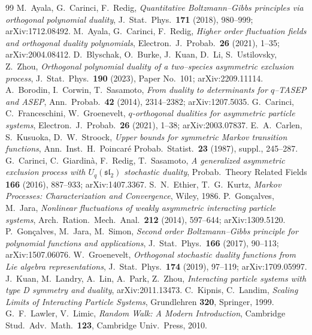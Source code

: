 \documentclass[11pt]{article}
\theoremstyle{plain}
\theoremstyle{definition}
\theoremstyle{remark}
\newcommand{\sutwo}{\mathfrak{sl}_2}\newcommand{\Lt}{\widetilde{\mathcal L}}
\begin{document}
\begin{thebibliography}{99}
 M.~Ayala, G.~Carinci, F.~Redig, \emph{Quantitative Boltzmann--Gibbs
principles via orthogonal polynomial duality}, J.~Stat.~Phys.~\textbf{171} (2018),
980--999; arXiv:1712.08492.
 M.~Ayala, G.~Carinci, F.~Redig, \emph{Higher order fluctuation fields and
orthogonal duality polynomials}, Electron.~J.~Probab.~\textbf{26} (2021), 1--35;
arXiv:2004.08412.
 D.~Blyschak, O.~Burke, J.~Kuan, D.~Li, S.~Ustilovsky, Z.~Zhou,
\emph{Orthogonal polynomial duality of a two--species asymmetric exclusion process},
J.~Stat.~Phys.~\textbf{190} (2023), Paper No.~101; arXiv:2209.11114.
 A.~Borodin, I.~Corwin, T.~Sasamoto, \emph{From duality to determinants for
$q$--TASEP and ASEP}, Ann.~Probab.~\textbf{42} (2014), 2314--2382; arXiv:1207.5035.
 G.~Carinci, C.~Franceschini, W.~Groenevelt, \emph{$q$-orthogonal
dualities for asymmetric particle systems}, Electron.~J.~Probab.~\textbf{26} (2021),
1--38; arXiv:2003.07837.
 E.~A.~Carlen, S.~Kusuoka, D.~W.~Stroock, \emph{Upper bounds for symmetric
Markov transition functions}, Ann.~Inst.~H.~Poincar\'e Probab.~Statist.~\textbf{23}
(1987), suppl., 245--287.
 G.~Carinci, C.~Giardin\`a, F.~Redig, T.~Sasamoto, \emph{A generalized
asymmetric exclusion process with $U_q(\sutwo)$ stochastic duality}, Probab.~Theory
Related Fields \textbf{166} (2016), 887--933; arXiv:1407.3367.
 S.~N.~Ethier, T.~G.~Kurtz, \emph{Markov Processes: Characterization and
Convergence}, Wiley, 1986.
 P.~Gon\c{c}alves, M.~Jara, \emph{Nonlinear fluctuations of weakly asymmetric
interacting particle systems}, Arch.~Ration.~Mech.~Anal.~\textbf{212} (2014), 597--644;
arXiv:1309.5120.
 P.~Gon\c{c}alves, M.~Jara, M.~Simon, \emph{Second order Boltzmann--Gibbs
principle for polynomial functions and applications}, J.~Stat.~Phys.~\textbf{166} (2017),
90--113; arXiv:1507.06076.
 W.~Groenevelt, \emph{Orthogonal stochastic duality functions from Lie
algebra representations}, J.~Stat.~Phys.~\textbf{174} (2019), 97--119; arXiv:1709.05997.
 J.~Kuan, M.~Landry, A.~Lin, A.~Park, Z.~Zhou, \emph{Interacting particle
systems with type D symmetry and duality}, arXiv:2011.13473.
 C.~Kipnis, C.~Landim, \emph{Scaling Limits of Interacting Particle Systems},
Grundlehren \textbf{320}, Springer, 1999.
 G.~F.~Lawler, V.~Limic, \emph{Random Walk: A Modern Introduction},
Cambridge Stud.~Adv.~Math.~\textbf{123}, Cambridge Univ.~Press, 2010.

\end{thebibliography}
\end{document}
